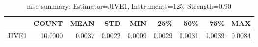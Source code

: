 \begin{table}[ht]
\centering
\caption{mse summary: Estimator=JIVE1, Instruments=125, Strength=0.90}
\begin{tabular}{lrrrrrrrr}
\toprule
 & COUNT & MEAN & STD & MIN & 25\% & 50\% & 75\% & MAX \\
\midrule
JIVE1 & 10.0000 & 0.0037 & 0.0022 & 0.0009 & 0.0029 & 0.0031 & 0.0039 & 0.0084 \\
\bottomrule
\end{tabular}
\end{table}
